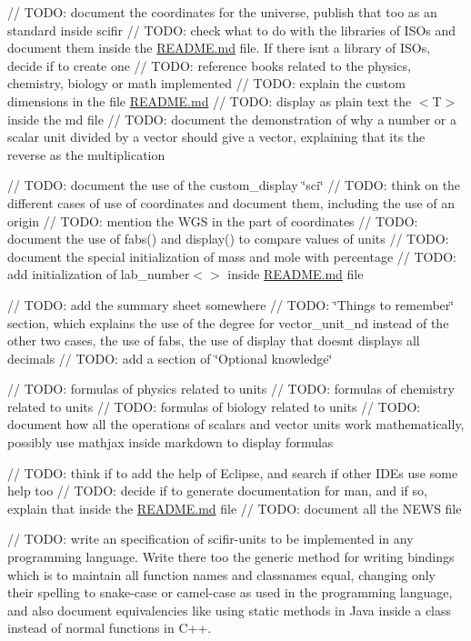 // TODO\+: document the coordinates for the universe, publish that too as an standard inside scifir // TODO\+: check what to do with the libraries of ISOs and document them inside the \mbox{\hyperlink{README_8md}{README.\+md}} file. If there isn\textquotesingle{}t a library of ISOs, decide if to create one // TODO\+: reference books related to the physics, chemistry, biology or math implemented // TODO\+: explain the custom dimensions in the file \mbox{\hyperlink{README_8md}{README.\+md}} // TODO\+: display as plain text the $<$\+T$>$ inside the md file // TODO\+: document the demonstration of why a number or a scalar unit divided by a vector should give a vector, explaining that it\textquotesingle{}s the reverse as the multiplication

// TODO\+: document the use of the custom\+\_\+display \char`\"{}sci\char`\"{} // TODO\+: think on the different cases of use of coordinates and document them, including the use of an origin // TODO\+: mention the WGS in the part of coordinates // TODO\+: document the use of fabs() and display() to compare values of units // TODO\+: document the special initialization of mass and mole with percentage // TODO\+: add initialization of lab\+\_\+number$<$$>$ inside \mbox{\hyperlink{README_8md}{README.\+md}} file

// TODO\+: add the summary sheet somewhere // TODO\+: \char`\"{}\+Things to remember\char`\"{} section, which explains the use of the degree for vector\+\_\+unit\+\_\+nd instead of the other two cases, the use of fabs, the use of display that doesn\textquotesingle{}t displays all decimals // TODO\+: add a section of \char`\"{}\+Optional knowledge\char`\"{}

// TODO\+: formulas of physics related to units // TODO\+: formulas of chemistry related to units // TODO\+: formulas of biology related to units // TODO\+: document how all the operations of scalars and vector units work mathematically, possibly use mathjax inside markdown to display formulas

// TODO\+: think if to add the help of Eclipse, and search if other IDEs use some help too // TODO\+: decide if to generate documentation for man, and if so, explain that inside the \mbox{\hyperlink{README_8md}{README.\+md}} file // TODO\+: document all the NEWS file

// TODO\+: write an specification of scifir-\/units to be implemented in any programming language. Write there too the generic method for writing bindings which is to maintain all function names and classnames equal, changing only their spelling to snake-\/case or camel-\/case as used in the programming language, and also document equivalencies like using static methods in Java inside a class instead of normal functions in C++.

